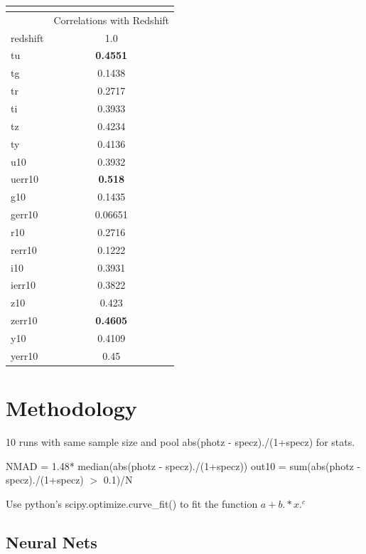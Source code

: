 \documentclass[13pt]{amsart}
\begin{document}
    \begin{center}
    \begin{tabular}{|l|c|}
      \multicolumn{2}{c}{} \\ \hline
       & Correlations with Redshift \\ \hline
      redshift & 1.0 \\ \hline
      tu & \textbf{0.4551} \\ \hline
      tg & 0.1438 \\ \hline
      tr & 0.2717 \\ \hline
      ti & 0.3933 \\ \hline
      tz & 0.4234 \\ \hline
      ty & 0.4136 \\ \hline
      u10 & 0.3932 \\ \hline
      uerr10 & \textbf{0.518} \\ \hline
      g10 & 0.1435 \\ \hline
      gerr10 & 0.06651 \\ \hline
      r10 & 0.2716 \\ \hline
      rerr10 & 0.1222 \\ \hline
      i10 & 0.3931 \\ \hline
      ierr10 & 0.3822 \\ \hline
      z10 & 0.423 \\ \hline
      zerr10 & \textbf{0.4605} \\ \hline
      y10 & 0.4109 \\ \hline
      yerr10 & 0.45 \\ \hline
    \end{tabular}
    \end{center}


\section{Methodology}
  10 runs with same sample size and pool abs(photz - specz)./(1+specz) for stats.

  NMAD = 1.48* median(abs(photz - specz)./(1+specz))
  out10 = sum(abs(photz - specz)./(1+specz) $>$ 0.1)/N


  Use python's scipy.optimize.curve\_fit() to fit the function $a+b.*x.^c$



  \subsection{Neural Nets}
\end{document}
